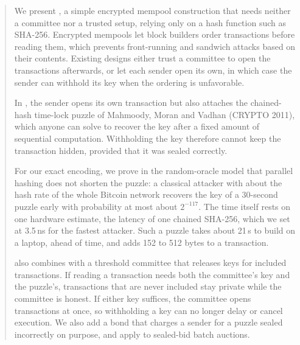 \begin{abstract}
\noindent
We present \leanseal, a simple encrypted mempool construction that needs neither a committee nor a trusted setup, relying only on a hash function such as SHA-256. Encrypted mempools let block builders order transactions before reading them, which prevents front-running and sandwich attacks based on their contents. Existing designs either trust a committee to open the transactions afterwards, or let each sender open its own, in which case the sender can withhold its key when the ordering is unfavorable.

In \leanseal, the sender opens its own transaction but also attaches the chained-hash time-lock puzzle of Mahmoody, Moran and Vadhan (CRYPTO 2011), which anyone can solve to recover the key after a fixed amount of sequential computation. Withholding the key therefore cannot keep the transaction hidden, provided that it was sealed correctly.

For our exact encoding, we prove in the random-oracle model that parallel hashing does not shorten the puzzle: a classical attacker with about the hash rate of the whole Bitcoin network recovers the key of a 30-second puzzle early with probability at most about $2^{-117}$. The time itself rests on one hardware estimate, the latency of one chained SHA-256, which we set at 3.5\,ns for the fastest attacker. Such a puzzle takes about 21\,s to build on a laptop, ahead of time, and adds 152 to 512 bytes to a transaction.

\leanseal also combines with a threshold committee that releases keys for included transactions. If reading a transaction needs both the committee's key and the puzzle's, transactions that are never included stay private while the committee is honest. If either key suffices, the committee opens transactions at once, so withholding a key can no longer delay or cancel execution. We also add a bond that charges a sender for a puzzle sealed incorrectly on purpose, and apply \leanseal to sealed-bid batch auctions.
\end{abstract}
